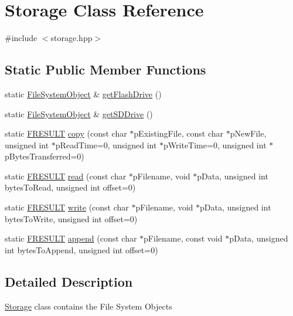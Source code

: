 \hypertarget{classStorage}{}\section{Storage Class Reference}
\label{classStorage}


{\ttfamily \#include $<$storage.\+hpp$>$}

\subsection*{Static Public Member Functions}
\begin{DoxyCompactItemize}
\item 
static \hyperlink{classFileSystemObject}{File\+System\+Object} \& \hyperlink{classStorage_a8849735d4f29dfdaa85963910640a2fa}{get\+Flash\+Drive} ()
\item 
static \hyperlink{classFileSystemObject}{File\+System\+Object} \& \hyperlink{classStorage_a532c72157ee6a6327626094f874d1794}{get\+S\+D\+Drive} ()
\item 
static \hyperlink{ff_8h_a49d0171ecbd362cda5680a0d360db44c}{F\+R\+E\+S\+U\+LT} \hyperlink{classStorage_a0c07e0acbb42e8bca52f08096de5b2eb}{copy} (const char $\ast$p\+Existing\+File, const char $\ast$p\+New\+File, unsigned int $\ast$p\+Read\+Time=0, unsigned int $\ast$p\+Write\+Time=0, unsigned int $\ast$p\+Bytes\+Transferred=0)
\item 
static \hyperlink{ff_8h_a49d0171ecbd362cda5680a0d360db44c}{F\+R\+E\+S\+U\+LT} \hyperlink{classStorage_a775d91a943daa23474d6a32ebae1f429}{read} (const char $\ast$p\+Filename, void $\ast$p\+Data, unsigned int bytes\+To\+Read, unsigned int offset=0)
\item 
static \hyperlink{ff_8h_a49d0171ecbd362cda5680a0d360db44c}{F\+R\+E\+S\+U\+LT} \hyperlink{classStorage_a0194f1c6e14b23a759685a88c2e1bf0c}{write} (const char $\ast$p\+Filename, void $\ast$p\+Data, unsigned int bytes\+To\+Write, unsigned int offset=0)
\item 
static \hyperlink{ff_8h_a49d0171ecbd362cda5680a0d360db44c}{F\+R\+E\+S\+U\+LT} \hyperlink{classStorage_a1f87f7c58c929bede3987fb5cb664fcc}{append} (const char $\ast$p\+Filename, const void $\ast$p\+Data, unsigned int bytes\+To\+Append, unsigned int offset=0)
\end{DoxyCompactItemize}


\subsection{Detailed Description}
\hyperlink{classStorage}{Storage} class contains the File System Objects


